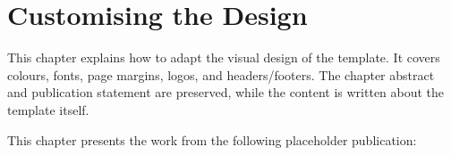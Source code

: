 \chapter{Customising the Design}
\glsresetall

\begin{cabstract}
This chapter explains how to adapt the visual design of the template. It covers colours, fonts, page margins, logos, and headers/footers. The chapter abstract and publication statement are preserved, while the content is written about the template itself.
\end{cabstract}

This chapter presents the work from the following placeholder publication:







